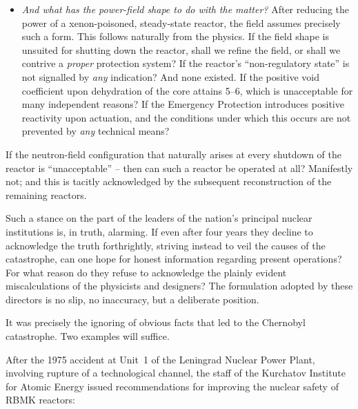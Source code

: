\documentclass[openright]{bookest}
\begin{document}
\begin{itemize}
\item \textit{And what has the power-field shape to do with the matter?} After reducing the power of a xenon-poisoned, steady-state reactor, the field assumes precisely such a form. This follows naturally from the physics. If the field shape is unsuited for shutting down the reactor, shall we refine the field, or shall we contrive a \textit{proper} protection system? If the reactor's ``non-regulatory state'' is not signalled by \textit{any} indication? And none existed. If the positive void coefficient upon dehydration of the core attains \qtyrange[range-phrase=\text{--}]{5}{6}{\beta}, which is unacceptable for many independent reasons? If the Emergency Protection introduces positive reactivity upon actuation, and the conditions under which this occurs are not prevented by \textit{any} technical means?
\end{itemize}

If the neutron-field configuration that naturally arises at every shutdown of the reactor is ``unacceptable'' -- then can such a reactor be operated at all? Manifestly not; and this is tacitly acknowledged by the subsequent reconstruction of the remaining reactors.

Such a stance on the part of the leaders of the nation's principal nuclear institutions is, in truth, alarming. If even after four years they decline to acknowledge the truth forthrightly, striving instead to veil the causes of the catastrophe, can one hope for honest information regarding present operations? For what reason do they refuse to acknowledge the plainly evident miscalculations of the physicists and designers? The formulation adopted by these directors is no slip, no inaccuracy, but a deliberate position.

It was precisely the ignoring of obvious facts that led to the Chernobyl catastrophe. Two examples will suffice.

After the 1975 accident at Unit~1 of the Leningrad Nuclear Power Plant, involving rupture of a technological channel, the staff of the Kurchatov Institute for Atomic Energy issued recommendations for improving the nuclear safety of RBMK reactors:
\end{document}
